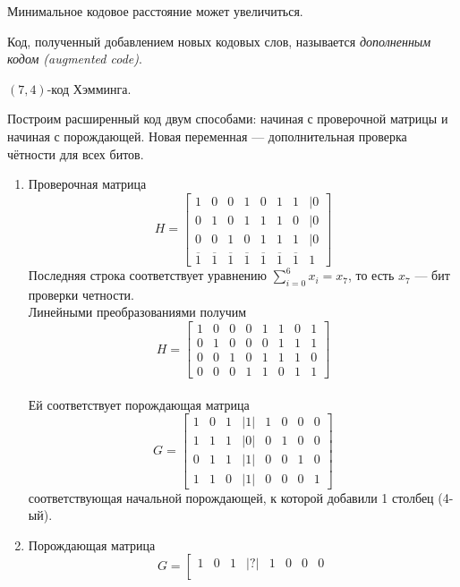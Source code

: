 Минимальное кодовое расстояние может увеличиться.
\begin{definition}
Код, полученный добавлением новых кодовых слов, называется \emph{дополненным
кодом (augmented code)}.




\end{definition}
\begin{example}
$\left(7,4\right)$-код Хэмминга. 

Построим расширенный код двум способами: начиная с проверочной матрицы
и начиная с порождающей. Новая переменная --- дополнительная проверка
чётности для всех битов.\end{example}
\begin{enumerate}
\item Проверочная матрица 
$$H=\left[\begin{array}{cccccccc}
1 & 0 & 0 & 1 & 0 & 1 & 1 & |0\\
0 & 1 & 0 & 1 & 1 & 1 & 0 & |0\\
0 & 0 & 1 & 0 & 1 & 1 & 1 & |0\\
\overline{1} & \overline{1} & \overline{1} & \overline{1} & \overline{1} & \overline{1} & \overline{1} & 1
\end{array}\right]$$
Последняя строка соответствует уравнению $\sum\limits_{i=0}^{6} x_i = x_7$, то
есть $x_7$ --- бит проверки четности.\\
Линейными преобразованиями получим $$H=\left[\begin{array}{cccccccc}
1 & 0 & 0 & 0 & 1 & 1 & 0 & 1\\
0 & 1 & 0 & 0 & 0 & 1 & 1 & 1\\
0 & 0 & 1 & 0 & 1 & 1 & 1 & 0\\
0 & 0 & 0 & 1 & 1 & 0 & 1 & 1
\end{array}\right]$$ \\
Ей соответствует порождающая матрица $$G=\left[\begin{array}{cccccccc}
1 & 0 & 1 & |1| & 1 & 0 & 0 & 0\\
1 & 1 & 1 & |0| & 0 & 1 & 0 & 0\\
0 & 1 & 1 & |1| & 0 & 0 & 1 & 0\\
1 & 1 & 0 & |1| & 0 & 0 & 0 & 1
\end{array}\right]$$ 
 соответствующая начальной порождающей, к которой добавили 1 столбец
(4-ый).
\item Порождающая матрица $$G=\left[\begin{array}{cccccccc}
1 & 0 & 1 & |?| & 1 & 0 & 0 & 0\\

\end{array}$$
\end{enumerate}
